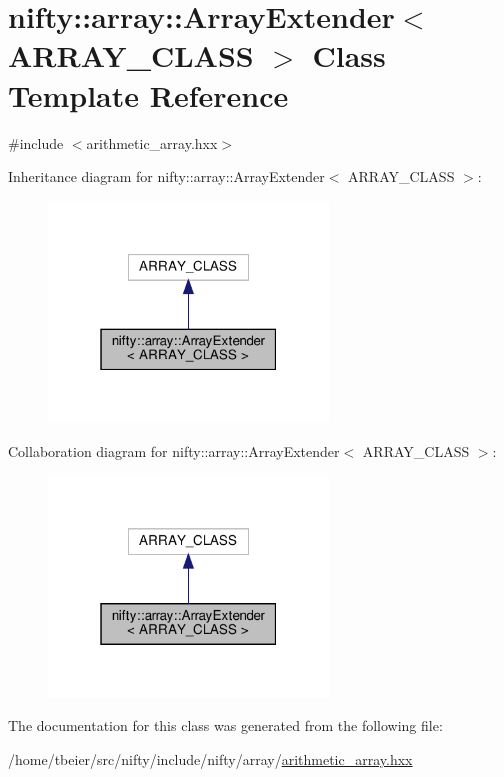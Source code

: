\hypertarget{classnifty_1_1array_1_1ArrayExtender}{}\section{nifty\+:\+:array\+:\+:Array\+Extender$<$ A\+R\+R\+A\+Y\+\_\+\+C\+L\+A\+SS $>$ Class Template Reference}
\label{classnifty_1_1array_1_1ArrayExtender}


{\ttfamily \#include $<$arithmetic\+\_\+array.\+hxx$>$}



Inheritance diagram for nifty\+:\+:array\+:\+:Array\+Extender$<$ A\+R\+R\+A\+Y\+\_\+\+C\+L\+A\+SS $>$\+:
\nopagebreak
\begin{figure}[H]
\begin{center}
\leavevmode
\includegraphics[width=211pt]{classnifty_1_1array_1_1ArrayExtender__inherit__graph}
\end{center}
\end{figure}


Collaboration diagram for nifty\+:\+:array\+:\+:Array\+Extender$<$ A\+R\+R\+A\+Y\+\_\+\+C\+L\+A\+SS $>$\+:
\nopagebreak
\begin{figure}[H]
\begin{center}
\leavevmode
\includegraphics[width=211pt]{classnifty_1_1array_1_1ArrayExtender__coll__graph}
\end{center}
\end{figure}


The documentation for this class was generated from the following file\+:\begin{DoxyCompactItemize}
\item 
/home/tbeier/src/nifty/include/nifty/array/\hyperlink{arithmetic__array_8hxx}{arithmetic\+\_\+array.\+hxx}\end{DoxyCompactItemize}
